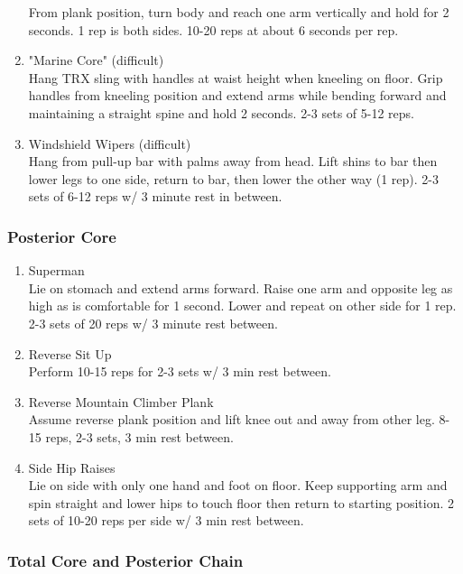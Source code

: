 \documentclass[12pt, letterpaper]{article}
\begin{document}
\begin{enumerate}
          From plank position, turn body and reach one arm vertically and hold for 2 seconds. 1 rep is both sides. 
          10-20 reps at about 6 seconds per rep. 
    \item "Marine Core" (difficult) \\ 
          Hang TRX sling with handles at waist height when kneeling on floor. Grip handles from kneeling position 
          and extend arms while bending forward and maintaining a straight spine and hold 2 seconds. 2-3 sets of 5-12 reps.
    \item Windshield Wipers (difficult) \\ 
          Hang from pull-up bar with palms away from head. Lift shins to bar then lower legs to one side, return to bar, 
          then lower the other way (1 rep). 2-3 sets of 6-12 reps w/ 3 minute rest in between.    
\end{enumerate}

\subsubsection{Posterior Core}

\begin{enumerate}

    \item Superman\\ 
          Lie on stomach and extend arms forward. Raise one arm and opposite leg as high as is comfortable for 1 second.
          Lower and repeat on other side for 1 rep. 2-3 sets of 20 reps w/ 3 minute rest between.
    \item Reverse Sit Up\\ 
          Perform 10-15 reps for 2-3 sets w/ 3 min rest between.
    \item Reverse Mountain Climber Plank\\ 
          Assume reverse plank position and lift knee out and away from other leg. 8-15 reps, 2-3 sets, 3 min rest between.
    \item Side Hip Raises\\ 
          Lie on side with only one hand and foot on floor. Keep supporting arm and spin straight and lower hips to touch floor
          then return to starting position. 2 sets of 10-20 reps per side w/ 3 min rest between.
\end{enumerate}

\subsubsection{Total Core and Posterior Chain}
\end{document}
